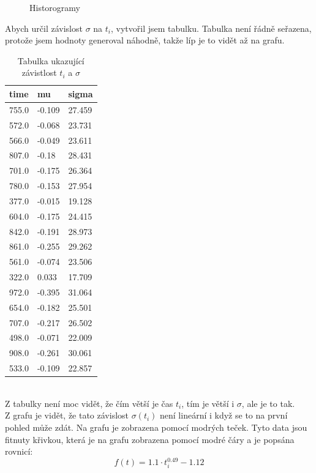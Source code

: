 \documentclass{article}
\begin{document}
\begin{figure}
\begin{subfigure}{.3\textwidth}
\end{subfigure}
\newline

\caption{Historogramy}
\end{figure}

\newpage
Abych určil závislost $\sigma$ na $t_{i}$, vytvořil jsem tabulku.
Tabulka není řádně seřazena, protože jsem hodnoty generoval náhodně,
takže líp je to vidět až na grafu.
  \begin{table}[!ht]
    \centering
    \begin{tabular}{|l|l|l|}
    \hline
        time & mu & sigma \\ \hline
        755.0 & -0.109 & 27.459 \\ \hline
        572.0 & -0.068 & 23.731 \\ \hline
        566.0 & -0.049 & 23.611 \\ \hline
        807.0 & -0.18 & 28.431 \\ \hline
        701.0 & -0.175 & 26.364 \\ \hline
        780.0 & -0.153 & 27.954 \\ \hline
        377.0 & -0.015 & 19.128 \\ \hline
        604.0 & -0.175 & 24.415 \\ \hline
        842.0 & -0.191 & 28.973 \\ \hline
        861.0 & -0.255 & 29.262 \\ \hline
        561.0 & -0.074 & 23.506 \\ \hline
        322.0 & 0.033 & 17.709 \\ \hline
        972.0 & -0.395 & 31.064 \\ \hline
        654.0 & -0.182 & 25.501 \\ \hline
        707.0 & -0.217 & 26.502 \\ \hline
        498.0 & -0.071 & 22.009 \\ \hline
        908.0 & -0.261 & 30.061 \\ \hline
        533.0 & -0.109 & 22.857 \\ \hline
    \end{tabular}
    \caption{Tabulka ukazující závistlost $t_{i}$ a $\sigma$}
  \end{table}
  \\
  Z tabulky není moc vidět, že čím větší je čas $t_{i}$, tím je větší i $\sigma$, ale je to tak.\\
  \newpage
  Z grafu je vidět, že tato závislost $\sigma(t_{i})$ není lineární i když se to
  na první pohled může zdát. Na grafu je zobrazena pomocí modrých teček.
  Tyto data jsou fitnuty křivkou, která je na grafu zobrazena pomocí
  modré čáry a je popsána rovnicí:
  $$f(t) = 1.1 \cdot t_{i}^{0.49} - 1.12$$
\end{document}
